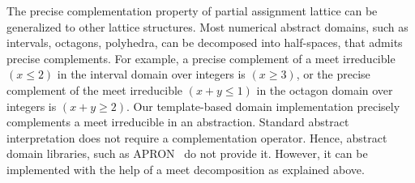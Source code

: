 %
%
The precise complementation property of partial assignment lattice can
be generalized to other lattice structures.  Most numerical abstract
domains, such as intervals, octagons, polyhedra, can be decomposed
into half-spaces, that admits precise complements.  For example, a
precise complement of a meet irreducible $(x \leq 2)$ in the interval
domain over integers is $(x \geq 3)$, or the precise complement of
the meet irreducible $(x+y \leq 1)$ in the octagon domain over
integers is $(x+y \geq 2)$.  Our template-based domain implementation
precisely complements a meet irreducible in an abstraction.  
% 
%
Standard abstract interpretation does not require a complementation
operator. Hence, abstract domain libraries, such as APRON~\cite{apron}
do not provide it.  However, it can be implemented with the help of a
meet decomposition as explained above.

